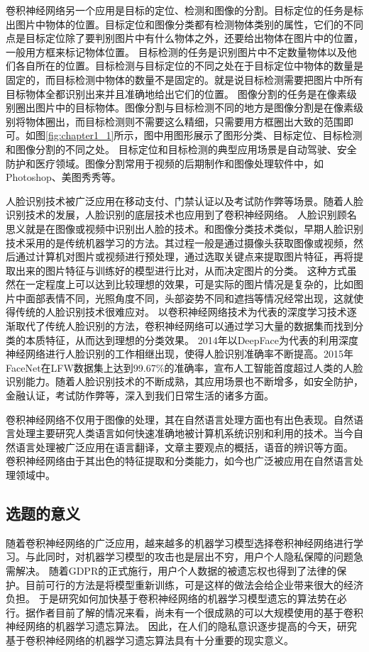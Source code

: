卷积神经网络另一个应用是目标的定位、检测和图像的分割。目标定位的任务是标出图片中物体的位置。目标定位和图像分类都有检测物体类别的属性，它们的不同点是目标定位除了要判别图片中有什么物体之外，还要给出物体在图片中的位置，一般用方框来标记物体位置。
目标检测的任务是识别图片中不定数量物体以及他们各自所在的位置。目标检测与目标定位的不同之处在于目标定位中物体的数量是固定的，而目标检测中物体的数量不是固定的。就是说目标检测需要把图片中所有目标物体全都识别出来并且准确地给出它们的位置。
图像分割的任务是在像素级别圈出图片中的目标物体。图像分割与目标检测不同的地方是图像分割是在像素级别将物体圈出，而目标检测则不需要这么精细，只需要用方框圈出大致的范围即可。如图\ref{fig:chapter1_1}所示，图中用图形展示了图形分类、目标定位、目标检测和图像分割的不同之处。
目标定位和目标检测的典型应用场景是自动驾驶、安全防护和医疗领域。图像分割常用于视频的后期制作和图像处理软件中，如Photoshop、美图秀秀等。

人脸识别技术被广泛应用在移动支付、门禁认证以及考试防作弊等场景。随着人脸识别技术的发展，人脸识别的底层技术也应用到了卷积神经网络。
人脸识别顾名思义就是在图像或视频中识别出人脸的技术。和图像分类技术类似，早期人脸识别技术采用的是传统机器学习的方法。其过程一般是通过摄像头获取图像或视频，然后通过计算机对图片或视频进行预处理，通过选取关键点来提取图片特征，再将提取出来的图片特征与训练好的模型进行比对，从而决定图片的分类。
这种方式虽然在一定程度上可以达到比较理想的效果，可是实际的图片情况是复杂的，比如图片中面部表情不同，光照角度不同，头部姿势不同和遮挡等情况经常出现，这就使得传统的人脸识别技术很难应对。
以卷积神经网络技术为代表的深度学习技术逐渐取代了传统人脸识别的方法，卷积神经网络可以通过学习大量的数据集而找到分类的本质特征，从而达到理想的分类效果。
2014年以DeepFace为代表的利用深度神经网络进行人脸识别的工作相继出现，使得人脸识别准确率不断提高。2015年FaceNet在LFW数据集上达到99.67$\%$的准确率，宣布人工智能首度超过人类的人脸识别能力。随着人脸识别技术的不断成熟，其应用场景也不断增多，如安全防护，金融认证，考试防作弊等，深入到我们日常生活的诸多方面。

卷积神经网络不仅用于图像的处理，其在自然语言处理方面也有出色表现。自然语言处理主要研究人类语言如何快速准确地被计算机系统识别和利用的技术。当今自然语言处理被广泛应用在语言翻译，文章主要观点的概括，语音的辨识等方面。
卷积神经网络由于其出色的特征提取和分类能力，如今也广泛被应用在自然语言处理领域中。

\subsection{选题的意义}
随着卷积神经网络的广泛应用，越来越多的机器学习模型选择卷积神经网络进行学习。与此同时，对机器学习模型的攻击也是层出不穷，用户个人隐私保障的问题急需解决。
随着GDPR的正式施行，用户个人数据的被遗忘权也得到了法律的保护。目前可行的方法是将模型重新训练，可是这样的做法会给企业带来很大的经济负担。
于是研究如何加快基于卷积神经网络的机器学习模型遗忘的算法势在必行。据作者目前了解的情况来看，尚未有一个很成熟的可以大规模使用的基于卷积神经网络的机器学习遗忘算法。
因此，在人们的隐私意识逐步提高的今天，研究基于卷积神经网络的机器学习遗忘算法具有十分重要的现实意义。
